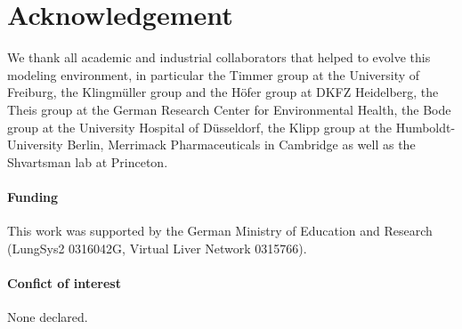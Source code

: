 \documentclass{bioinfo}
\begin{document}
\section*{Acknowledgement}
We thank all academic and industrial collaborators that helped to evolve this modeling environment, in particular the Timmer group at the University of Freiburg, the Klingm\"uller group and the H\"ofer group at DKFZ Heidelberg, the Theis group at the German Research Center for Environmental Health, the Bode group at the University Hospital of D\"usseldorf, the Klipp group at the Humboldt-University Berlin, Merrimack Pharmaceuticals in Cambridge as well as the Shvartsman lab at Princeton. 

\paragraph{Funding\textcolon} This work was supported by the German Ministry of Education and Research (LungSys2 0316042G, Virtual Liver Network 0315766).

\paragraph{Confict of interest\textcolon} None declared.



\end{document}

